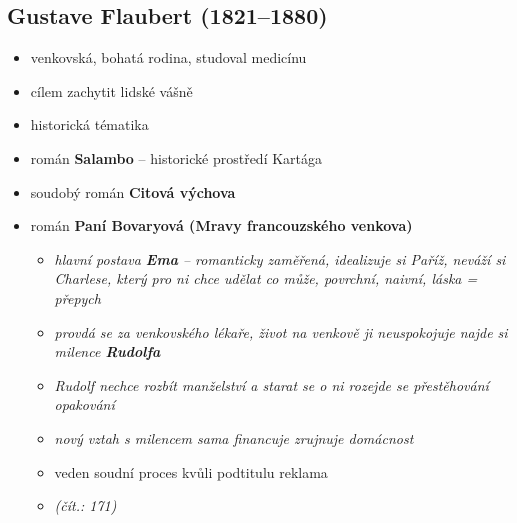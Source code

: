\subsection{Gustave Flaubert (1821--1880)}
\begin{itemize}
\item venkovská, bohatá rodina, studoval medicínu
\item cílem zachytit lidské vášně 
\item historická tématika
\item román \textbf{Salambo} -- historické prostředí Kartága
\item soudobý román \textbf{Citová výchova}
\item román \textbf{Paní Bovaryová (Mravy francouzského venkova)}
	\begin{itemize}
	\item \textit{hlavní postava \textbf{Ema} -- romanticky zaměřená,  idealizuje si Paříž, neváží si Charlese, který pro ni chce udělat co může, povrchní, naivní, láska = přepych}
	\item \textit{provdá se za venkovského lékaře, život na venkově ji neuspokojuje \ra najde si milence \textbf{Rudolfa}}
	\item \textit{Rudolf nechce rozbít manželství a starat se o ni \ra rozejde se \ra přestěhování \ra opakování}
	\item \textit{nový vztah s milencem sama financuje \ra zrujnuje domácnost}
	\item veden soudní proces kvůli podtitulu \ra reklama 
	\item \textit{(čít.: 171)}
	\end{itemize}
\end{itemize}

